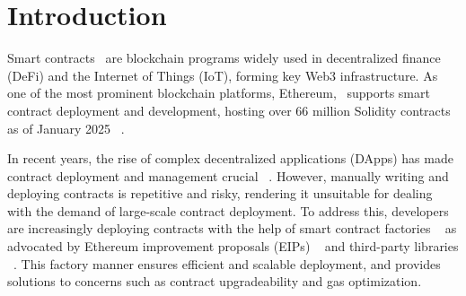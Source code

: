 \documentclass[acmsmall, screen]{acmart}
\begin{document}



	\maketitle

	\section{Introduction}
	\label{sec:intro} Smart contracts~\cite{smartcontract} are blockchain programs widely used in decentralized
	finance (DeFi) and the Internet of Things (IoT), forming key Web3 infrastructure. As one of the most
	prominent blockchain platforms, Ethereum,~\cite{ethereum} supports smart contract deployment and
	development, hosting over 66 million Solidity contracts as of January 2025 ~\cite{smart_contract_deployment}.

	In recent years, the rise of complex decentralized applications (DApps) has made contract
	deployment and management crucial~ \cite{DBLP:journals/ese/ChenXLGY21,DBLP:conf/wcre/TsiounisK22,DBLP:journals/tse/ZouLKLXFCX21,
		DBLP:conf/IEEEcloud/NayakNSK18}. However, manually writing and deploying contracts is repetitive
	and risky, rendering it unsuitable for dealing with the demand of large-scale contract
	deployment. To address this, developers are increasingly deploying contracts with the help of
	smart contract factories ~\cite{factory-contract} as advocated by Ethereum improvement proposals
	(EIPs) ~\cite{eip-1014,eip-1167,eip-2470,eip-3171} and third-party libraries ~\cite{openz-clones,0age-metamorphic,openz-create2,openz-proxyfactory,nft-factory}.
	This factory manner ensures efficient and scalable deployment, and provides solutions to concerns
	such as contract upgradeability and gas optimization.
\end{document}
